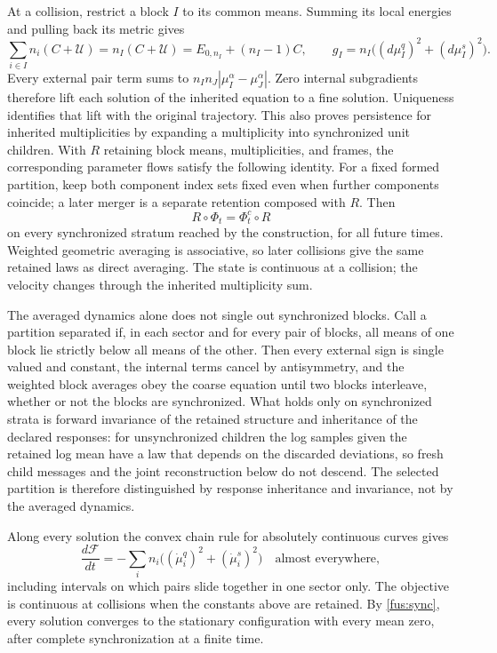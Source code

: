 At a collision, restrict a block $I$ to its common means. Summing its local
energies and pulling back its metric gives
\begin{equation}
 \sum_{i\in I}n_i(C+\mathcal U)
 =n_I(C+\mathcal U)=E_{0,n_I}+(n_I-1)C,\qquad
 g_I=n_I\bigl((d\mu_I^q)^2+(d\mu_I^s)^2\bigr).
\end{equation}
Every external pair term sums to
$n_In_J|\mu_I^\alpha-\mu_J^\alpha|$. Zero internal subgradients therefore
lift each solution of the inherited equation to a fine solution. Uniqueness
identifies that lift with the original trajectory. This also proves
persistence for inherited multiplicities by expanding a multiplicity into
synchronized unit children. With $R$ retaining block means, multiplicities,
and frames, the corresponding parameter flows satisfy the following
identity. For a fixed formed partition, keep both component index sets
fixed even when further components coincide; a later merger is a separate
retention composed with $R$. Then
\begin{equation}
 R\circ\Phi_t=\Phi_t^c\circ R
 \label{fus:flow-square}
\end{equation}
on every synchronized stratum reached by the construction, for all future
times. Weighted geometric averaging is associative, so later collisions
give the same retained laws as direct averaging. The state is continuous
at a collision; the velocity changes through the inherited multiplicity sum.

The averaged dynamics alone does not single out synchronized blocks. Call a
partition separated if, in each sector and for every pair of blocks, all
means of one block lie strictly below all means of the other. Then every
external sign is single valued and constant, the internal terms cancel by
antisymmetry, and the weighted block averages obey the coarse equation until
two blocks interleave, whether or not the blocks are synchronized. What
holds only on synchronized strata is forward invariance of the retained
structure and inheritance of the declared responses: for unsynchronized
children the log samples given the retained log mean have a law that depends
on the discarded deviations, so fresh child messages and the joint
reconstruction below do not descend. The selected partition is therefore
distinguished by response inheritance and invariance, not by the averaged
dynamics.

Along every solution the convex chain rule for absolutely continuous curves
\cite{Brezis1973} gives
\begin{equation}
 \frac{d\mathcal F}{dt}
 =-\sum_i n_i\bigl((\dot\mu_i^q)^2+(\dot\mu_i^s)^2\bigr)
 \quad\text{almost everywhere},
\end{equation}
including intervals on which pairs slide together in one sector only. The
objective is continuous at collisions when the constants above are
retained. By \cref{fus:sync}, every solution converges to the stationary
configuration with every mean zero, after complete synchronization at a
finite time.

